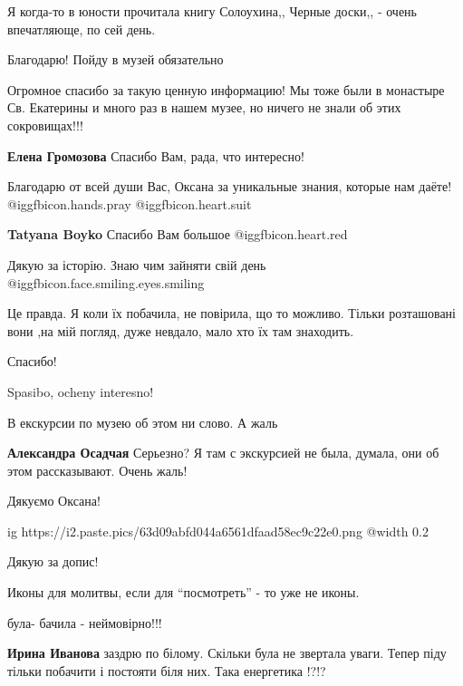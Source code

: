 \begin{itemize}
Я когда-то в юности прочитала книгу Солоухина,, Черные доски,, - очень впечатляюще, по сей день.

Благодарю! Пойду в музей обязательно


Огромное спасибо за такую ценную информацию! Мы тоже были в монастыре Св.
Екатерины и много раз в нашем музее, но ничего не знали об этих сокровищах!!!

\textbf{Елена Громозова} Спасибо Вам, рада, что интересно!


Благодарю от всей души Вас, Оксана за уникальные знания, которые нам даёте!
@igg{fbicon.hands.pray}  @igg{fbicon.heart.suit}

\textbf{Tatyana Boyko} Спасибо Вам большое @igg{fbicon.heart.red}

Дякую за історію.
Знаю чим зайняти свій день  @igg{fbicon.face.smiling.eyes.smiling} 


Це правда. Я коли їх побачила, не повірила, що то можливо. Тільки розташовані
вони ,на мій погляд, дуже невдало, мало хто їх там знаходить.


Спасибо!

Spasibo, ocheny interesno!

В екскурсии по музею об этом ни слово. А жаль

\textbf{Александра Осадчая} Серьезно? Я там с экскурсией не была, думала, они об этом рассказывают. Очень жаль!

Дякуємо Оксана!

\ifcmt
  ig https://i2.paste.pics/63d09abfd044a6561dfaad58ec9c22e0.png
  @width 0.2
\fi

Дякую за допис!

Иконы для молитвы, если для \enquote{посмотреть} - то уже не иконы.

була- бачила - неймовірно!!!

\begin{itemize} %
\textbf{Ирина Иванова} заздрю по білому. Скільки була не звертала уваги. Тепер
піду тільки побачити і постояти біля них. Така енергетика !?!?
\end{itemize} %


\end{itemize}
